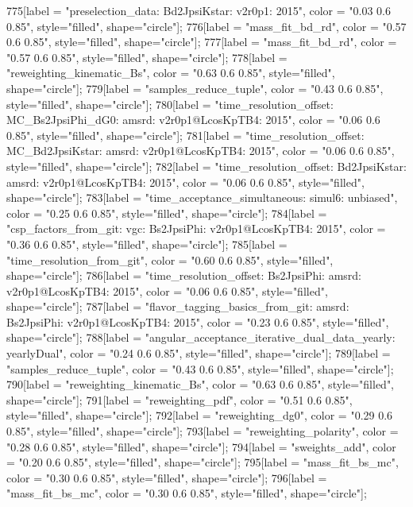 {	775[label = "preselection_data\nmode: Bd2JpsiKstar\nversion: v2r0p1\nyear: 2015", color = "0.03 0.6 0.85", style="filled", shape="circle"];
	776[label = "mass_fit_bd_rd", color = "0.57 0.6 0.85", style="filled", shape="circle"];
	777[label = "mass_fit_bd_rd", color = "0.57 0.6 0.85", style="filled", shape="circle"];
	778[label = "reweighting_kinematic_Bs", color = "0.63 0.6 0.85", style="filled", shape="circle"];
	779[label = "samples_reduce_tuple", color = "0.43 0.6 0.85", style="filled", shape="circle"];
	780[label = "time_resolution_offset\nmode: MC_Bs2JpsiPhi_dG0\ntimeres: amsrd\nversion: v2r0p1@LcosKpTB4\nyear: 2015", color = "0.06 0.6 0.85", style="filled", shape="circle"];
	781[label = "time_resolution_offset\nmode: MC_Bd2JpsiKstar\ntimeres: amsrd\nversion: v2r0p1@LcosKpTB4\nyear: 2015", color = "0.06 0.6 0.85", style="filled", shape="circle"];
	782[label = "time_resolution_offset\nmode: Bd2JpsiKstar\ntimeres: amsrd\nversion: v2r0p1@LcosKpTB4\nyear: 2015", color = "0.06 0.6 0.85", style="filled", shape="circle"];
	783[label = "time_acceptance_simultaneous\ntimeacc: simul6\ntrigger: unbiased", color = "0.25 0.6 0.85", style="filled", shape="circle"];
	784[label = "csp_factors_from_git\ncsp: vgc\nmode: Bs2JpsiPhi\nversion: v2r0p1@LcosKpTB4\nyear: 2015", color = "0.36 0.6 0.85", style="filled", shape="circle"];
	785[label = "time_resolution_from_git", color = "0.60 0.6 0.85", style="filled", shape="circle"];
	786[label = "time_resolution_offset\nmode: Bs2JpsiPhi\ntimeres: amsrd\nversion: v2r0p1@LcosKpTB4\nyear: 2015", color = "0.06 0.6 0.85", style="filled", shape="circle"];
	787[label = "flavor_tagging_basics_from_git\nflavor: amsrd\nmode: Bs2JpsiPhi\nversion: v2r0p1@LcosKpTB4\nyear: 2015", color = "0.23 0.6 0.85", style="filled", shape="circle"];
	788[label = "angular_acceptance_iterative_dual_data_yearly\nangacc: yearlyDual", color = "0.24 0.6 0.85", style="filled", shape="circle"];
	789[label = "samples_reduce_tuple", color = "0.43 0.6 0.85", style="filled", shape="circle"];
	790[label = "reweighting_kinematic_Bs", color = "0.63 0.6 0.85", style="filled", shape="circle"];
	791[label = "reweighting_pdf", color = "0.51 0.6 0.85", style="filled", shape="circle"];
	792[label = "reweighting_dg0", color = "0.29 0.6 0.85", style="filled", shape="circle"];
	793[label = "reweighting_polarity", color = "0.28 0.6 0.85", style="filled", shape="circle"];
	794[label = "sweights_add", color = "0.20 0.6 0.85", style="filled", shape="circle"];
	795[label = "mass_fit_bs_mc", color = "0.30 0.6 0.85", style="filled", shape="circle"];
	796[label = "mass_fit_bs_mc", color = "0.30 0.6 0.85", style="filled", shape="circle"];
}
